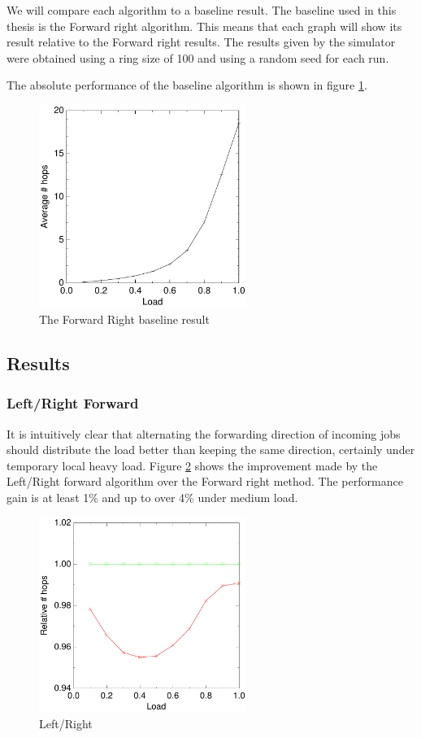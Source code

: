 \documentclass[10pt,a4paper]{article}
\begin{document}
We will compare each algorithm to a baseline result. The baseline used in this thesis is the Forward right algorithm. This means that each graph will show its result relative to the Forward right results. The results given by the simulator were obtained using a ring size of 100 and using a random seed for each run.

The absolute performance of the baseline algorithm is shown in figure \ref{baseline}.

\begin{figure}[h!tb]
\centering
\includegraphics[width=0.6\textwidth]{data/right.pdf}
\caption{The Forward Right baseline result}
\label{baseline}
\end{figure}

\subsection{Results}
\label{simresults}

\subsubsection*{Left/Right Forward}
It is intuitively clear that alternating the forwarding direction of incoming jobs should distribute the load better than keeping the same direction, certainly under temporary local heavy load. Figure \ref{figlr} shows the improvement made by the Left/Right forward algorithm over the Forward right method. The performance gain is at least 1\% and up to over 4\% under medium load.

\begin{figure}[h!tb]
\centering
\includegraphics[width=0.6\textwidth]{data/switchright.pdf}
\caption{Left/Right}
\label{figlr}
\end{figure}
\end{document}
